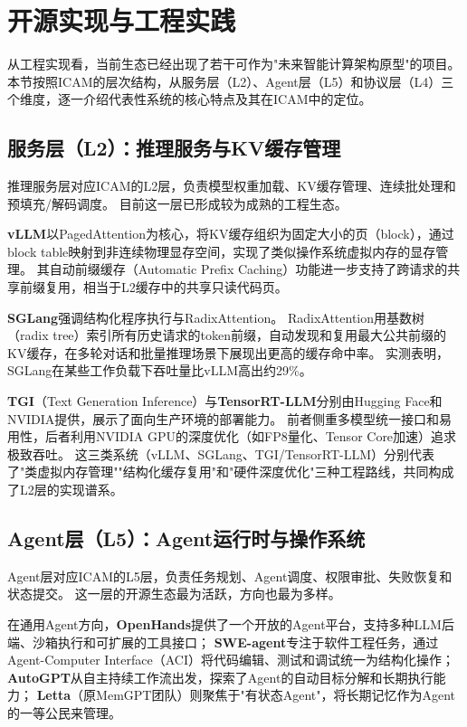 \section{开源实现与工程实践}
\label{sec:implementation}

从工程实现看，当前生态已经出现了若干可作为"未来智能计算架构原型"的项目。
本节按照ICAM的层次结构，从服务层（L2）、Agent层（L5）和协议层（L4）三个维度，逐一介绍代表性系统的核心特点及其在ICAM中的定位。

\subsection{服务层（L2）：推理服务与KV缓存管理}

推理服务层对应ICAM的L2层，负责模型权重加载、KV缓存管理、连续批处理和预填充/解码调度。
目前这一层已形成较为成熟的工程生态。

\textbf{vLLM}以PagedAttention为核心，将KV缓存组织为固定大小的页（block），通过block table映射到非连续物理显存空间，实现了类似操作系统虚拟内存的显存管理\cite{kwon2023pagedattention,vllm_docs_2026}。
其自动前缀缓存（Automatic Prefix Caching）功能进一步支持了跨请求的共享前缀复用，相当于L2缓存中的共享只读代码页\cite{vllm_prefix_2026}。

\textbf{SGLang}强调结构化程序执行与RadixAttention\cite{sglang2024,sglang_docs_2026}。
RadixAttention用基数树（radix tree）索引所有历史请求的token前缀，自动发现和复用最大公共前缀的KV缓存，在多轮对话和批量推理场景下展现出更高的缓存命中率。
实测表明，SGLang在某些工作负载下吞吐量比vLLM高出约29\%\cite{sglang2024}。

\textbf{TGI}（Text Generation Inference）与\textbf{TensorRT-LLM}分别由Hugging Face和NVIDIA提供，展示了面向生产环境的部署能力\cite{tgi_docs_2026,tensorrtllm_docs_2026}。
前者侧重多模型统一接口和易用性，后者利用NVIDIA GPU的深度优化（如FP8量化、Tensor Core加速）追求极致吞吐。
这三类系统（vLLM、SGLang、TGI/TensorRT-LLM）分别代表了"类虚拟内存管理""结构化缓存复用"和"硬件深度优化"三种工程路线，共同构成了L2层的实现谱系。

\subsection{Agent层（L5）：Agent运行时与操作系统}

Agent层对应ICAM的L5层，负责任务规划、Agent调度、权限审批、失败恢复和状态提交。
这一层的开源生态最为活跃，方向也最为多样。

在通用Agent方向，\textbf{OpenHands}提供了一个开放的Agent平台，支持多种LLM后端、沙箱执行和可扩展的工具接口\cite{openhands_paper_2025}；
\textbf{SWE-agent}专注于软件工程任务，通过Agent-Computer Interface（ACI）将代码编辑、测试和调试统一为结构化操作\cite{sweagent2024}；
\textbf{AutoGPT}从自主持续工作流出发，探索了Agent的自动目标分解和长期执行能力\cite{autogpt_platform_2026}；
\textbf{Letta}（原MemGPT团队）则聚焦于"有状态Agent"，将长期记忆作为Agent的一等公民来管理\cite{letta_stateful_2026}。

